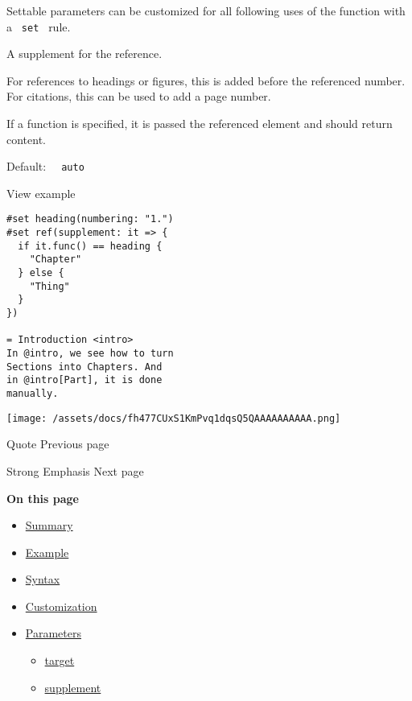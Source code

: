 \label{parameters-supplement-settable-tooltip}
Settable parameters can be customized for all following uses of the
function with a \texttt{\ set\ } rule.

A supplement for the reference.

For references to headings or figures, this is added before the
referenced number. For citations, this can be used to add a page number.

If a function is specified, it is passed the referenced element and
should return content.

Default: \texttt{\ }{\texttt{\ auto\ }}\texttt{\ }


View example

\begin{verbatim}
#set heading(numbering: "1.")
#set ref(supplement: it => {
  if it.func() == heading {
    "Chapter"
  } else {
    "Thing"
  }
})

= Introduction <intro>
In @intro, we see how to turn
Sections into Chapters. And
in @intro[Part], it is done
manually.
\end{verbatim}

\texttt{[image: /assets/docs/fh477CUxS1KmPvq1dqsQ5QAAAAAAAAAA.png]}

\href{/docs/reference/model/quote/}{\pandocbounded{}}

{ Quote } { Previous page }

\href{/docs/reference/model/strong/}{\pandocbounded{}}

{ Strong Emphasis } { Next page }

\textbf{On this page}

\begin{itemize}
\tightlist
\item
  \hyperref[summary]{Summary}
\item
  \hyperref[example]{Example}
\item
  \hyperref[syntax]{Syntax}
\item
  \hyperref[customization]{Customization}
\item
  \hyperref[parameters]{Parameters}

  \begin{itemize}
  \tightlist
  \item
    \hyperref[parameters-target]{target}
  \item
    \hyperref[parameters-supplement]{supplement}
  \end{itemize}
\end{itemize}

